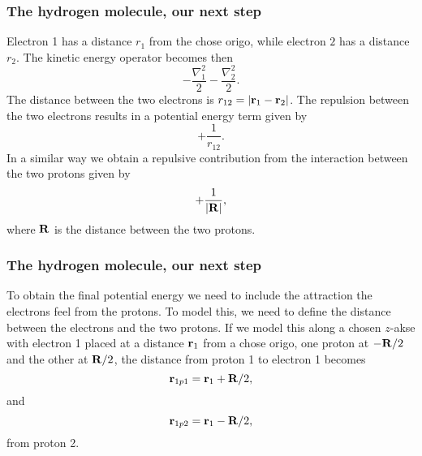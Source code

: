 \documentclass[compress]{beamer}
\begin{document}
\frame
{
  \frametitle{The hydrogen molecule, our next step}
\begin{small}
{\scriptsize
Electron 1 has a distance $r_1$ from the chose origo, while  electron $2$
has a distance $r_2$. 
The kinetic energy operator becomes then
\[
   -\frac{\nabla_1^2}{2}-\frac{\nabla_2^2}{2}.
\]
The distance between the two electrons is
$r_{12}=|{\bf r}_1-{\bf r}_2|$. 
The repulsion between the two electrons results in a potential energy term given by
\[
               +\frac{1}{r_{12}}.
\]
In a similar way we obtain a repulsive contribution from the interaction between the two 
protons given by
\[
               +\frac{1}{|{\bf R}|},
\]
where ${\bf R}$ is the distance between the two protons.
}
\end{small}
}


\frame
{
  \frametitle{The hydrogen molecule, our next step}
\begin{small}
{\scriptsize
To obtain the final potential energy we need to include the attraction the electrons feel from the protons.
To model this, we need to define the distance between the electrons and the two protons.
If we model this along a 
chosen $z$-akse with electron 1 placed at a distance 
${\bf r}_1$ from a chose origo, one proton at $-{\bf R}/2$
and the other at  ${\bf R}/2$, 
the distance from proton 1 to electron 1 becomes
\[
{\bf r}_{1p1}={\bf r}_1+ {\bf R}/2,
\]
and
\[
{\bf r}_{1p2}={\bf r}_1- {\bf R}/2,
\]
from proton 2.
}
\end{small}
}
\end{document}
